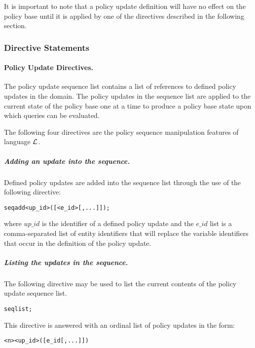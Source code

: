 \documentclass[11pt, twocolumn]{article}
\newenvironment{vverbose}
  {\begin{alltt}}
  {\vspace{-\baselineskip}\end{alltt}}
\begin{document}
          It is important to note that a policy update definition will have no
          effect on the policy base until it is applied by one of the directives
          described in the following section.

        \subsubsection{Directive Statements}

        \paragraph{Policy Update Directives.}

        The policy update sequence list contains a list of references to
        defined policy updates in the domain. The policy updates in the
        sequence list are applied to the current state of the policy base one
        at a time to produce a policy base state upon which queries can be
        evaluated.

        The following four directives are the policy sequence manipulation
        features of language $\cal{L}$.

        \subparagraph{Adding an update into the sequence.}
          Defined policy updates are added into the sequence list through the
          use of the following directive:

          \begin{vverbose}
seq add <up\_id>([<e\_id>[, ...]]);
          \end{vverbose}

          \noindent where $up\_id$ is the identifier of a defined policy
          update and the $e\_id$ list is a comma-separated list of entity
          identifiers that will replace the variable identifiers that occur in
          the definition of the policy update.

        \subparagraph{Listing the updates in the sequence.}
          The following directive may be used to list the current contents of
          the policy update sequence list.

          \begin{vverbose}
seq list;
          \end{vverbose}

          This directive is answered with an ordinal list of policy updates in
          the form:

          \begin{vverbose}
<n> <up\_id>([e\_id[, ...]])
          \end{vverbose}
\end{document}
